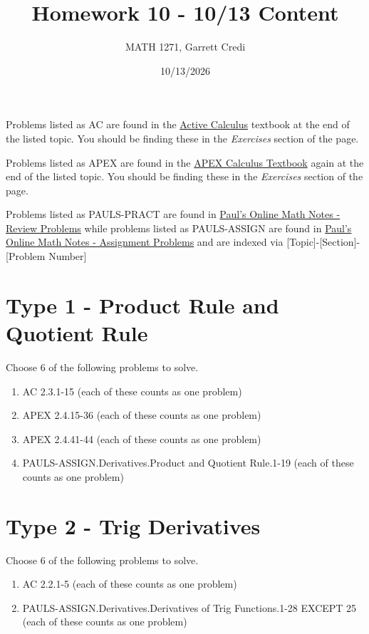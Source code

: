 \documentclass[12pt]{article}
\title{Homework 10 - 10/13 Content}
\author{MATH 1271, Garrett Credi}
\date{10/13/2026}
\begin{document}
\maketitle

Problems listed as AC are found in the \href{https://activecalculus.org/single1e/frontmatter.html}{Active Calculus} 
textbook at the end of the listed topic. You should be finding these in the \textit{Exercises} section of the page.

Problems listed as APEX are found in the \href{https://opentext.uleth.ca/apex-calculus/apex-calculus.html}{APEX Calculus Textbook}
again at the end of the listed topic. You should be finding these in the \textit{Exercises} section of the page.

Problems listed as PAULS-PRACT are found in \href{https://tutorial.math.lamar.edu/Problems/CalcI/CalcI.aspx}{Paul's Online Math Notes - Review Problems}
while problems listed as PAULS-ASSIGN are found in \href{https://tutorial.math.lamar.edu/ProblemsNS/CalcI/CalcI.aspx}{Paul's Online Math Notes - Assignment Problems}
and are indexed via [Topic]-[Section]-[Problem Number]

\section{Type 1 - Product Rule and Quotient Rule}
Choose 6 of the following problems to solve.

\begin{enumerate}
  \item AC 2.3.1-15 (each of these counts as one problem)
  \item APEX 2.4.15-36 (each of these counts as one problem)
  \item APEX 2.4.41-44 (each of these counts as one problem)
  \item PAULS-ASSIGN.Derivatives.Product and Quotient Rule.1-19 (each of these counts as one problem)
\end{enumerate}

\section{Type 2 - Trig Derivatives}
Choose 6 of the following problems to solve.

\begin{enumerate}
  \item AC 2.2.1-5 (each of these counts as one problem)
  \item PAULS-ASSIGN.Derivatives.Derivatives of Trig Functions.1-28 EXCEPT 25 (each of these counts as one problem)
\end{enumerate}
\end{document}
